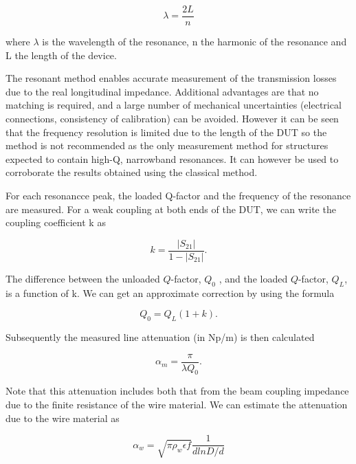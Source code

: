 \begin{equation}
\lambda = \frac{2L}{n}
\end{equation}

where $\lambda$ is the wavelength of the resonance, n the harmonic of the resonance and L the length of the device. 

The resonant method enables accurate measurement of the transmission losses due to the real longitudinal impedance. Additional advantages are that no matching is required, and a large number of mechanical uncertainties (electrical connections, consistency of calibration) can be avoided. However it can be seen that the frequency resolution is limited due to the length of the DUT so the method is not recommended as the only measurement method for structures expected to contain high-Q, narrowband resonances. It can however be used to corroborate the results obtained using the classical method.

For each resonancce peak, the loaded Q-factor and the frequency of the resonance are measured. For a weak coupling at both ends of the DUT, we can write the coupling coefficient k as

\begin{equation}
k = \frac{\left| S_{21} \right|}{1 - \left| S_{21} \right| }.
\label{eqn:coupling_coeff}
\end{equation}

The difference between the unloaded $Q$-factor, $Q_{0}$ , and the loaded $Q$-factor, $Q_{L}$, is a function of k. We can get an approximate correction by using the formula

\begin{equation}
Q_{0} = Q_{L} \left( 1 + k  \right).
\label{eqn:Q_correc}
\end{equation}

Subsequently the measured line attenuation (in Np/m) is then calculated

\begin{equation}
\alpha_{m} = \frac{\pi}{\lambda Q_{0}}.
\label{eqn:atten}
\end{equation}

Note that this attenuation includes both that from the beam coupling impedance due to the finite resistance of the wire material. We can estimate the attenuation due to the wire material as

\begin{equation}
\alpha_{w} = \sqrt{\pi \rho_{w} \epsilon f} \frac{1}{d ln D/d}
\label{eqn:wire_atten}
\end{equation}

